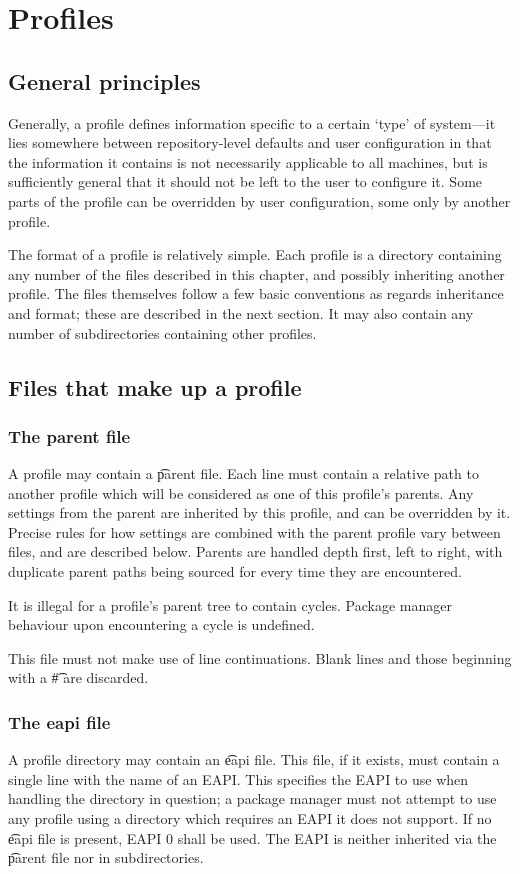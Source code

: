 \chapter{Profiles}
\label{ch:profiles}

\section{General principles}
Generally, a profile defines information specific to a certain `type' of system---it lies somewhere
between repository-level defaults and user configuration in that the information it contains is not
necessarily applicable to all machines, but is sufficiently general that it should not be left to
the user to configure it. Some parts of the profile can be overridden by user configuration, some
only by another profile.

The format of a profile is relatively simple. Each profile is a directory containing any number of
the files described in this chapter, and possibly inheriting another profile. The files themselves
follow a few basic conventions as regards inheritance and format; these are described in the next
section. It may also contain any number of subdirectories containing other profiles.

\section{Files that make up a profile}

\subsection{The parent file}
A profile may contain a \t{parent} file. Each line must contain a relative path to another profile
which will be considered as one of this profile's parents. Any settings from the parent are
inherited by this profile, and can be overridden by it. Precise rules for how settings are combined
with the parent profile vary between files, and are described below. Parents are handled depth
first, left to right, with duplicate parent paths being sourced for every time they are encountered.

It is illegal for a profile's parent tree to contain cycles. Package manager behaviour upon
encountering a cycle is undefined.

This file must not make use of line continuations. Blank lines and those beginning with a \t{\#}
are discarded.

\subsection{The eapi file}
\label{sec:profile-eapi}
A profile directory may contain an \t{eapi} file. This file, if it exists, must contain a single
line with the name of an EAPI\@. This specifies the EAPI to use when handling the directory in
question; a package manager must not attempt to use any profile using a directory which requires an
EAPI it does not support. If no \t{eapi} file is present, EAPI 0 shall be used. The EAPI is neither
inherited via the \t{parent} file nor in subdirectories.

